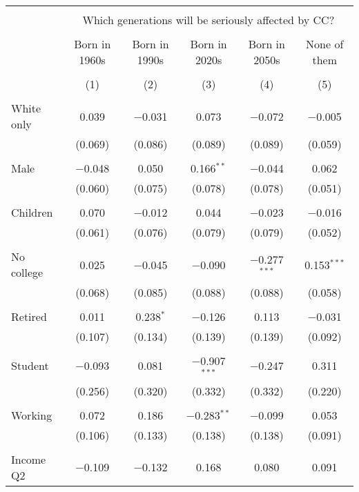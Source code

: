 
\begin{tabular}{@{\extracolsep{5pt}}lccccc} 
\\[-1.8ex]\hline 
\hline \\[-1.8ex] 
 & \multicolumn{5}{c}{Which generations will be seriously affected by CC?} \\ 
\cline{2-6} 
\\[-1.8ex] & Born in 1960s & Born in 1990s & Born in 2020s & Born in 2050s & None of them \\ 
\\[-1.8ex] & (1) & (2) & (3) & (4) & (5)\\ 
\hline \\[-1.8ex] 
 White only & 0.039 & $-$0.031 & 0.073 & $-$0.072 & $-$0.005 \\ 
  & (0.069) & (0.086) & (0.089) & (0.089) & (0.059) \\ 
  & & & & & \\ 
 Male & $-$0.048 & 0.050 & 0.166$^{**}$ & $-$0.044 & 0.062 \\ 
  & (0.060) & (0.075) & (0.078) & (0.078) & (0.051) \\ 
  & & & & & \\ 
 Children & 0.070 & $-$0.012 & 0.044 & $-$0.023 & $-$0.016 \\ 
  & (0.061) & (0.076) & (0.079) & (0.079) & (0.052) \\ 
  & & & & & \\ 
 No college & 0.025 & $-$0.045 & $-$0.090 & $-$0.277$^{***}$ & 0.153$^{***}$ \\ 
  & (0.068) & (0.085) & (0.088) & (0.088) & (0.058) \\ 
  & & & & & \\ 
 Retired & 0.011 & 0.238$^{*}$ & $-$0.126 & 0.113 & $-$0.031 \\ 
  & (0.107) & (0.134) & (0.139) & (0.139) & (0.092) \\ 
  & & & & & \\ 
 Student & $-$0.093 & 0.081 & $-$0.907$^{***}$ & $-$0.247 & 0.311 \\ 
  & (0.256) & (0.320) & (0.332) & (0.332) & (0.220) \\ 
  & & & & & \\ 
 Working & 0.072 & 0.186 & $-$0.283$^{**}$ & $-$0.099 & 0.053 \\ 
  & (0.106) & (0.133) & (0.138) & (0.138) & (0.091) \\ 
  & & & & & \\ 
 Income Q2 & $-$0.109 & $-$0.132 & 0.168 & 0.080 & 0.091 \\ 

\end{tabular}

